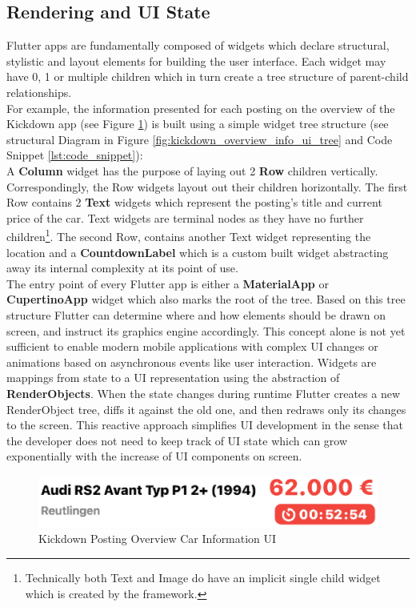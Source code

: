 \subsection{Rendering and UI State} \label{subsection::rendering_ui_state}
Flutter apps are fundamentally composed of widgets which declare structural, stylistic and layout elements for building the user interface. 
Each widget may have 0, 1 or multiple children which in turn create a tree structure of parent-child relationships. \\
For example, the information presented for each posting on the overview of the Kickdown app (see Figure \ref{fig:kickdown_overview_info_ui}) is built using a simple widget tree structure (see structural Diagram in Figure \ref{fig:kickdown_overview_info_ui_tree} and Code Snippet \ref{lst:code_snippet}):\\
A \textbf{Column} widget has the purpose of laying out 2 \textbf{Row} children vertically. Correspondingly, the Row widgets layout out their children horizontally. 
The first Row contains 2 \textbf{Text} widgets which represent the posting's title and current price of the car. 
Text widgets are terminal nodes as they have no further children\footnote{Technically both Text and Image do have an implicit single child widget which is created by the framework.}.
The second Row, contains another Text widget representing the location and a \textbf{CountdownLabel} which is a custom built widget abstracting away its internal complexity at its point of use.\\
The entry point of every Flutter app is either a \textbf{MaterialApp} or \textbf{CupertinoApp} widget which also marks the root of the tree.
Based on this tree structure Flutter can determine where and how elements should be drawn on screen, and instruct its graphics engine accordingly.
This concept alone is not yet sufficient to enable modern mobile applications with complex UI changes or animations 
based on asynchronous events like user interaction. 
Widgets are mappings from state to a UI representation using the abstraction of \textbf{RenderObjects}. When the state changes during runtime Flutter creates a new RenderObject tree, 
diffs it against the old one, and then redraws only its changes to the screen.
This reactive approach simplifies UI development in the sense that the developer does not need to keep track of UI state which can grow exponentially
with the increase of UI components on screen. 

\begin{figure}
    \centering
    \includegraphics[width=.5\linewidth]{images/posting_information_UI.eps}
    \caption{Kickdown Posting Overview Car Information UI}
    \label{fig:kickdown_overview_info_ui}
\end{figure}

